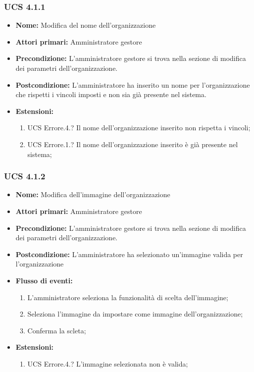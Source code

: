 \subsubsection{UCS 4.1.1}%
\begin{itemize}
\item \textbf{Nome:} Modifica del nome dell'organizzazione
\item \textbf{Attori primari:} Amministratore gestore
\item \textbf{Precondizione:} L'amministratore gestore si trova nella sezione di modifica dei parametri dell'organizzazione.
\item \textbf{Postcondizione:} L'amministratore ha inserito un nome per l'organizzazione che rispetti i vincoli imposti e non sia già presente nel sistema.
\item \textbf{Estensioni:}
\begin{enumerate}
    \item UCS Errore.4.? Il nome dell'organizzazione inserito non rispetta i vincoli;
    \item UCS Errore.1.? Il nome dell'organizzazione inserito è già presente nel sistema;
\end{enumerate}
\end{itemize}

\subsubsection{UCS 4.1.2}%
\begin{itemize}
\item \textbf{Nome:} Modifica dell'immagine dell'organizzazione
\item \textbf{Attori primari:} Amministratore gestore
\item \textbf{Precondizione:} L'amministratore gestore si trova nella sezione di modifica dei parametri dell'organizzazione.
\item \textbf{Postcondizione:} L'amministratore ha selezionato un'immagine valida per l'organizzazione
\item \textbf{Flusso di eventi:}
\begin{enumerate}
    \item L'amministratore seleziona la funzionalità di scelta dell'immagine;
    \item Seleziona l'immagine da impostare come immagine dell'organizzazione;
    \item Conferma la scleta;
\end{enumerate}
\item \textbf{Estensioni:}
\begin{enumerate}
    \item UCS Errore.4.? L'immagine selezionata non è valida;
\end{enumerate}
\end{itemize}

